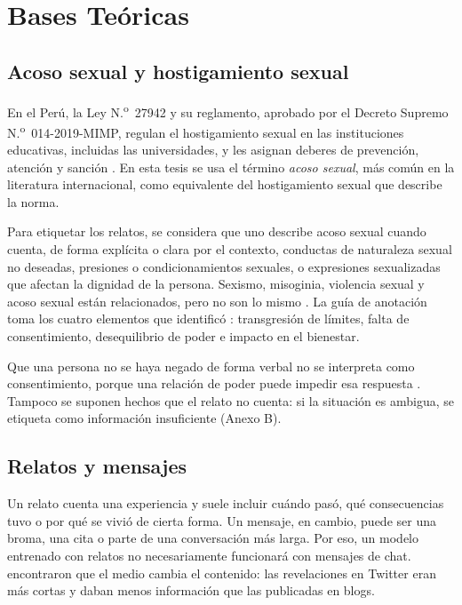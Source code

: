 \section{Bases Teóricas}

\subsection{Acoso sexual y hostigamiento sexual}
En el Perú, la Ley N.\textsuperscript{o}~27942 y su reglamento, aprobado por el Decreto Supremo N.\textsuperscript{o}~014-2019-MIMP, regulan el hostigamiento sexual en las instituciones educativas, incluidas las universidades, y les asignan deberes de prevención, atención y sanción \citep{ley27942, ds0142019}. En esta tesis se usa el término \textit{acoso sexual}, más común en la literatura internacional, como equivalente del hostigamiento sexual que describe la norma.

Para etiquetar los relatos, se considera que uno describe acoso sexual cuando cuenta, de forma explícita o clara por el contexto, conductas de naturaleza sexual no deseadas, presiones o condicionamientos sexuales, o expresiones sexualizadas que afectan la dignidad de la persona. Sexismo, misoginia, violencia sexual y acoso sexual están relacionados, pero no son lo mismo \citep{dutta2025, bull2026}. La guía de anotación toma los cuatro elementos que identificó \citet{rios2026}: transgresión de límites, falta de consentimiento, desequilibrio de poder e impacto en el bienestar.

Que una persona no se haya negado de forma verbal no se interpreta como consentimiento, porque una relación de poder puede impedir esa respuesta \citep{bull2026}. Tampoco se suponen hechos que el relato no cuenta: si la situación es ambigua, se etiqueta como información insuficiente (Anexo B).

\subsection{Relatos y mensajes}
Un relato cuenta una experiencia y suele incluir cuándo pasó, qué consecuencias tuvo o por qué se vivió de cierta forma. Un mensaje, en cambio, puede ser una broma, una cita o parte de una conversación más larga. Por eso, un modelo entrenado con relatos no necesariamente funcionará con mensajes de chat. \citet{gorissen2023} encontraron que el medio cambia el contenido: las revelaciones en Twitter eran más cortas y daban menos información que las publicadas en blogs.


